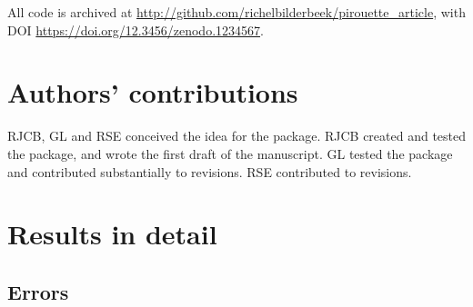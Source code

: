 \documentclass{article}
\begin{document}
All code is archived at \url{http://github.com/richelbilderbeek/pirouette_article},
with DOI \url{https://doi.org/12.3456/zenodo.1234567}.

\section{Authors' contributions}

RJCB, GL and RSE conceived the idea for the package. 
RJCB created and tested the package, and wrote the first draft of the manuscript.
GL tested the package and contributed substantially to revisions.
RSE contributed to revisions.




\appendix

\section{Results in detail}

\subsection{Errors}
\end{document}
